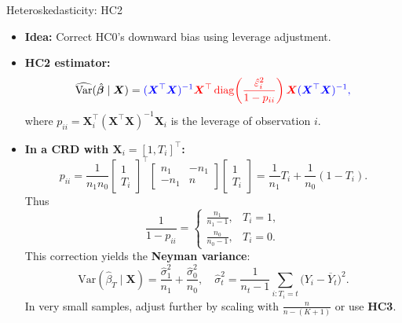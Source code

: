 \documentclass[10pt, handout]{beamer}
\theoremstyle{plain}
\newcommand{\bX}{\bm{X}}
\DeclareMathOperator{\diag}{diag}
\newcommand{\Var}{\mathrm{Var}}
\begin{document}
\begin{frame}{Heteroskedasticity: HC2}
\small
\begin{itemize}
  \item \textbf{Idea:} Correct HC0’s downward bias using leverage adjustment.
  \pause
  \vspace{0.4em}
  \item \textbf{HC2 estimator:}
  \[
  \widehat{\Var}(\hat{\bm{\beta}} \mid \bX)
  = \color{blue}{(\bX^\top \bX)^{-1}}
    \color{red}{\bX^\top \diag\!\left(\frac{\hat{\varepsilon}_i^2}{1 - p_{ii}}\right)\bX}
    \color{blue}{(\bX^\top \bX)^{-1}},
  \]
  where $p_{ii} = \bX_i^\top(\bX^\top\bX)^{-1}\bX_i$ is the leverage of observation $i$.
  \pause
  \vspace{1em}

  \item \textbf{In a CRD with $\bX_i = [1,T_i]^\top$:}
  \[
  p_{ii}
  = \frac{1}{n_1n_0}
    \begin{bmatrix}1\\T_i\end{bmatrix}^\top
    \begin{bmatrix}
      n_1 & -n_1 \\[3pt]
      -n_1 & n
    \end{bmatrix}
    \begin{bmatrix}1\\T_i\end{bmatrix}
  = \frac{1}{n_1}T_i + \frac{1}{n_0}(1-T_i).
  \]
  \pause
  Thus
  \[
  \frac{1}{1-p_{ii}} =
  \begin{cases}
    \frac{n_1}{n_1-1}, & T_i=1,\\[4pt]
    \frac{n_0}{n_0-1}, & T_i=0.
  \end{cases}
  \]
  \pause
  \vspace{0.5em}
  This correction yields the \textbf{Neyman variance}:
  \[
  \Var(\hat{\beta}_T \mid \bX)
  = \frac{\hat{\sigma}_1^2}{n_1} + \frac{\hat{\sigma}_0^2}{n_0},
  \quad
  \hat{\sigma}_t^2 = \frac{1}{n_t-1}\sum_{i:T_i=t}\big(Y_i-\overline{Y}_t\big)^2.
  \]
  \pause
  In very small samples, adjust further by scaling with $\tfrac{n}{n-(K+1)}$ or use \textbf{HC3}.
\end{itemize}
\end{frame}
\end{document}
